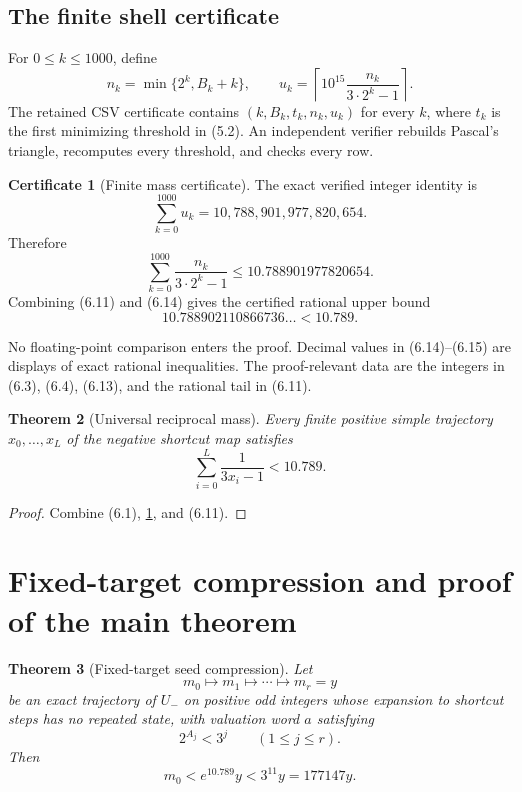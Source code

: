 \documentclass[11pt]{article}
\newtheorem{theorem}{Theorem}[section]
\theoremstyle{definition}
\newtheorem{certificate}[theorem]{Certificate}
\theoremstyle{remark}
\newcommand{\Um}{U_{-}}
\begin{document}
\subsection{The finite shell certificate}

For $0\le k\le1000$, define
\[
 n_k=\min\{2^k,B_k+k\},
 \qquad
 u_k=\left\lceil
 10^{15}\frac{n_k}{3\cdot2^k-1}
 \right\rceil.                                        \tag{6.12}
\]
The retained CSV certificate contains $(k,B_k,t_k,n_k,u_k)$ for every
$k$, where $t_k$ is the first minimizing threshold in \textup{(5.2)}.
An independent verifier rebuilds Pascal's triangle, recomputes every
threshold, and checks every row.

\begin{certificate}[Finite mass certificate]\label{cert:mass}
The exact verified integer identity is
\[
 \sum_{k=0}^{1000}u_k
 =10{,}788{,}901{,}977{,}820{,}654.                   \tag{6.13}
\]
Therefore
\[
 \sum_{k=0}^{1000}\frac{n_k}{3\cdot2^k-1}
 \le10.788901977820654.                               \tag{6.14}
\]
Combining \textup{(6.11)} and \textup{(6.14)} gives the certified rational upper
bound
\[
 10.788902110866736\ldots<10.789.                     \tag{6.15}
\]
\end{certificate}

No floating-point comparison enters the proof.  Decimal values in
\textup{(6.14)}--\textup{(6.15)} are displays of exact rational inequalities.  The
proof-relevant data are the integers in \textup{(6.3)}, \textup{(6.4)},
\textup{(6.13)}, and the rational tail in \textup{(6.11)}.

\begin{theorem}[Universal reciprocal mass]\label{thm:mass}
Every finite positive simple trajectory
$x_0,\ldots,x_L$ of the negative shortcut map satisfies
\[
 \sum_{i=0}^{L}\frac1{3x_i-1}<10.789.                 \tag{6.16}
\]
\end{theorem}

\begin{proof}
Combine \textup{(6.1)}, \cref{cert:mass}, and \textup{(6.11)}.
\end{proof}

\section{Fixed-target compression and proof of the main theorem}\label{sec:compression}

\begin{theorem}[Fixed-target seed compression]\label{thm:compression}
Let
\[
 m_0\longmapsto m_1\longmapsto\cdots\longmapsto m_r=y
\]
be an exact trajectory of $\Um$ on positive odd integers whose expansion to shortcut steps has no repeated state, with valuation
word $a$ satisfying
\[
 2^{A_j}<3^j\qquad(1\le j\le r).
\]
Then
\[
 m_0<e^{10.789}y<3^{11}y=177147y.                    \tag{7.1}
\]
\end{theorem}
\end{document}
